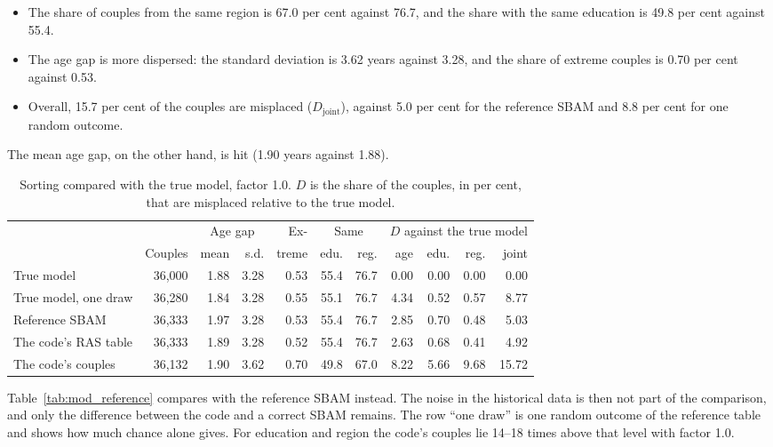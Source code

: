 \documentclass[12pt,a4paper]{article}
\begin{document}
\begin{itemize}
\item The share of couples from the same region is 67.0 per cent against 76.7, and the share with
the same education is 49.8 per cent against 55.4.
\item The age gap is more dispersed: the standard deviation is 3.62 years against 3.28, and the
share of extreme couples is 0.70 per cent against 0.53.
\item Overall, 15.7 per cent of the couples are misplaced ($D_{\text{joint}}$), against 5.0 per
cent for the reference SBAM and 8.8 per cent for one random outcome.
\end{itemize}

The mean age gap, on the other hand, is hit (1.90 years against 1.88).

\begin{table}[htb]
\centering
\caption{Sorting compared with the true model, factor 1.0. $D$ is the share of the couples, in per
cent, that are misplaced relative to the true model.}
\label{tab:sortering10}
\small
\begin{tabular}{@{}lrrrrrrrrrr@{}}
\toprule
 & & \multicolumn{2}{c}{Age gap} & Ex- & \multicolumn{2}{c}{Same} & \multicolumn{4}{c}{$D$ against the true model} \\
\cmidrule(lr){3-4}\cmidrule(lr){6-7}\cmidrule(l){8-11}
 & Couples & mean & s.d. & treme & edu. & reg. & age & edu. & reg. & joint \\
\midrule
True model & 36,000 & 1.88 & 3.28 & 0.53 & 55.4 & 76.7 & 0.00 & 0.00 & 0.00 & 0.00 \\
True model, one draw & 36,280 & 1.84 & 3.28 & 0.55 & 55.1 & 76.7 & 4.34 & 0.52 & 0.57 & 8.77 \\
Reference SBAM & 36,333 & 1.97 & 3.28 & 0.53 & 55.4 & 76.7 & 2.85 & 0.70 & 0.48 & 5.03 \\
The code's RAS table & 36,333 & 1.89 & 3.28 & 0.52 & 55.4 & 76.7 & 2.63 & 0.68 & 0.41 & 4.92 \\
The code's couples & 36,132 & 1.90 & 3.62 & 0.70 & 49.8 & 67.0 & 8.22 & 5.66 & 9.68 & 15.72 \\
\bottomrule
\end{tabular}
\end{table}

Table~\ref{tab:mod_reference} compares with the reference SBAM instead. The noise in the historical
data is then not part of the comparison, and only the difference between the code and a correct
SBAM remains. The row ``one draw'' is one random outcome of the reference table and shows how much
chance alone gives. For education and region the code's couples lie 14--18 times above that level
with factor 1.0.
\end{document}
